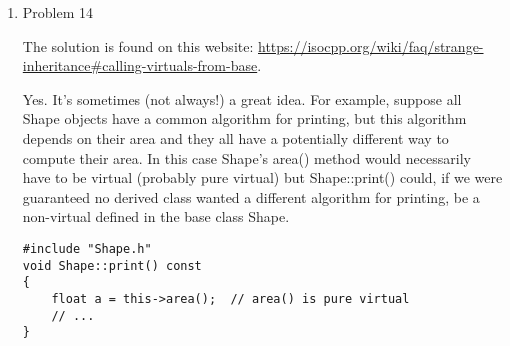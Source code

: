 \documentclass[10pt, onecolumn, draftcls]{IEEEtran}
\begin{document}
\begin{enumerate}
\item Problem 14

The solution is found on this website: \url{https://isocpp.org/wiki/faq/strange-inheritance#calling-virtuals-from-base}.

Yes. It’s sometimes (not always!) a great idea. For example, suppose all Shape objects have a common algorithm for printing, but this algorithm depends on their area and they all have a potentially different way to compute their area. In this case Shape’s area() method would necessarily have to be virtual (probably pure virtual) but Shape::print() could, if we were guaranteed no derived class wanted a different algorithm for printing, be a non-virtual defined in the base class Shape.
\begin{lstlisting}
#include "Shape.h"
void Shape::print() const
{
    float a = this->area();  // area() is pure virtual
    // ...
}
\end{lstlisting}

\end{enumerate}
\end{document}
